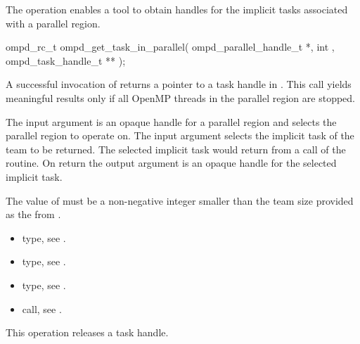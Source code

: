\label{subsubsubsec:ompd_get_task_in_parallel}
\summary
The   operation enables a tool to obtain handles for
the implicit tasks associated with a parallel region.

\format

\begin{cspecific}
\begin{ompSyntax}
ompd_rc_t ompd_get_task_in_parallel(
  ompd_parallel_handle_t *,
  int ,
  ompd_task_handle_t **
);
\end{ompSyntax}
\end{cspecific}


\descr
A successful invocation of   returns a pointer to
a task handle in .
This call yields meaningful results only if all OpenMP threads in the parallel
region are stopped.

\argdesc
The input argument  is an opaque handle for a parallel region
and selects the parallel region to operate on.
The input argument  selects the implicit task of the team to be 
returned.
The selected implicit task would return  from a call of the 
 routine.
On return the output argument  is an opaque handle for the selected 
implicit task.

\restrictions
The value of  must be a non-negative integer smaller than the
team size provided as the  from .

\crossreferences
\begin{itemize}
	\item {} type, see 
	.
	\item {} type, see .
	\item {} type, see .
	\item {} call, see 
	.
\end{itemize}

\label{subsubsubsec:ompd_release_task_handle}
\summary
This operation releases a task handle.

\format

